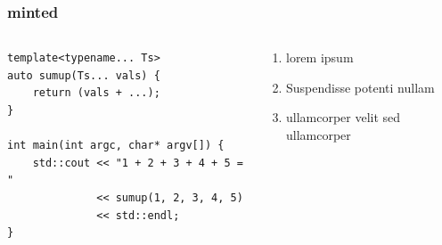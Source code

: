 \begin{frame}[fragile]
\frametitle{minted}

\begin{columns}[c]
\begin{column}{.5\textwidth}
\begin{verbatim}
template<typename... Ts>
auto sumup(Ts... vals) {
    return (vals + ...);
}

int main(int argc, char* argv[]) {
    std::cout << "1 + 2 + 3 + 4 + 5 = " 
              << sumup(1, 2, 3, 4, 5) 
              << std::endl;
}
\end{verbatim}
\end{column}

\begin{column}{.4\textwidth}
    \begin{enumerate}
        \item lorem ipsum
        \item Suspendisse potenti nullam
        \item ullamcorper velit sed ullamcorper
    \end{enumerate}
\end{column}
\end{columns}
\end{frame}

